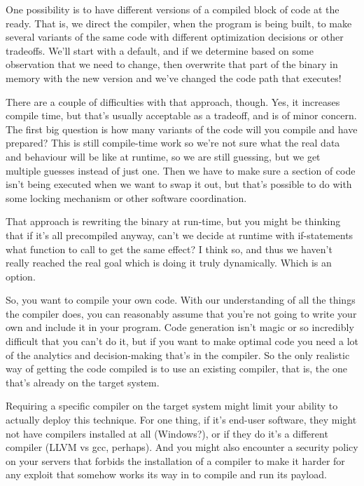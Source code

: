One possibility is to have different versions of a compiled block of code at the ready. That is, we direct the compiler, when the program is being built, to make several variants of the same code with different optimization decisions or other tradeoffs. We'll start with a default, and if we determine based on some observation that we need to change, then overwrite that part of the binary in memory with the new version and we've changed the code path that executes!

There are a couple of difficulties with that approach, though. Yes, it increases compile time, but that's usually acceptable as a tradeoff, and is of minor concern. The first big question is how many variants of the code will you compile and have prepared? This is still compile-time work so we're not sure what the real data and behaviour will be like at runtime, so we are still guessing, but we get multiple guesses instead of just one. Then we have to make sure a section of code isn't being executed when we want to swap it out, but that's possible to do with some locking mechanism or other software coordination.

That approach is rewriting the binary at run-time, but you might be thinking that if it's all precompiled anyway, can't we decide at runtime with if-statements what function to call to get the same effect? I think so, and thus we haven't really reached the real goal which is doing it truly dynamically. Which is an option.

So, you want to compile your own code. With our understanding of all the things the compiler does, you can reasonably assume that you're not going to write your own and include it in your program. Code generation isn't magic or so incredibly difficult that you can't do it, but if you want to make optimal code you need a lot of the analytics and decision-making that's in the compiler. So the only realistic way of getting the code compiled is to use an existing compiler, that is, the one that's already on the target system.

Requiring a specific compiler on the target system might limit your ability to actually deploy this technique. For one thing, if it's end-user software, they might not have compilers installed at all (Windows?), or if they do it's a different compiler (LLVM vs gcc, perhaps). And you might also encounter a security policy on your servers that forbids the installation of a compiler to make it harder for any exploit that somehow works its way in to compile and run its payload.


